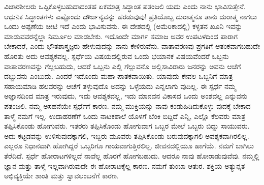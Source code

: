 ವಿಚಾರಶೀಲರು ಒಪ್ಪಿಕೊಳ್ಳಬಹುದಾದಂತಹ ಏಕಮಾತ್ರ ಸಿದ್ಧಾಂತ ಪತಂಜಲಿ ಯದು ಎಂದು ನಾನು ಭಾವಿಸುತ್ತೇನೆ. ಆಧುನಿಕ ಸಿದ್ಧಾಂತಗಳು ಎಷ್ಟೊಂದು ದೌರ್ಜನ್ಯವನ್ನು ಹರಡುವುವು! ಪ್ರತಿಯೊಬ್ಬ ದುರಾತ್ಮನೂ ತಾನು ದುರಾತ್ಮ ನಾಗಲು ಒಂದು ಅಪ್ಪಣೆಯ ಚೀಟಿ ಇದೆ ಎಂದು ಭಾವಿಸುವನು. ಈ ದೇಶದಲ್ಲಿ (ಅಮೆರಿಕಾದಲ್ಲಿ) ಕಳ್ಳತನ ಖೂನಿ ಇವನ್ನು ಮಾಡುವವರನ್ನೆಲ್ಲಾ ನಿರ್ಮೂಲ ಮಾಡಬೇಕು. ಇದೊಂದೇ ಮಾರ್ಗ ಸಮಾಜ ಅವರ ಉಪಟಳದಿಂದ ಪಾರಾಗ ಬೇಕಾದರೆ, ಎಂದು ಭೌತಶಾಸ್ತ್ರಜ್ಞರು ಹೇಳುವುದನ್ನು ನಾನು ಕೇಳಿರುವೆನು. ವಾತಾವರಣವು ಪ್ರಗತಿಗೆ ಆತಂಕವಾಗಬಹುದೇ ಹೊರತು ಅದು ಆವಶ್ಯಕವಲ್ಲ. ಸ್ಪರ್ಧೆಯ ವಿಷಯದಲ್ಲಿರುವ ಒಂದು ಭಯಾನಕ ವಿಷಯವೆಂದರೆ ಒಬ್ಬನು ವಾತಾವರಣವನ್ನು ಗೆಲ್ಲಬಹುದು, ಆದರೆ ಒಬ್ಬನು ಎಲ್ಲಿ ಗೆಲ್ಲುವನೊ ಅಲ್ಲಿಸಾವಿರಾರು ಜನರನ್ನು ಅವನು ಆಚೆಗೆ ದಬ್ಬುವನು ಎಂಬುದು. ಎಂದರೆ ಇದೊಂದು ಮಹಾ ಪಾತಕವಾಯಿತು. ಯಾವುದು ಕೇವಲ ಒಬ್ಬನಿಗೆ ಮಾತ್ರ ಸಹಾಯಮಾಡಿ ಹಲವರನ್ನು ಆಚೆಗೆ ತಳ್ಳುವುದೊ ಅದನ್ನು ಒಳ್ಳೆಯದು ಎನ್ನಲಾಗು ವುದಿಲ್ಲ. ಈ ಸ್ಪರ್ಧೆ ನಮ್ಮ ಅಜ್ಞಾನದಿಂದ ಮಾತ್ರ ಇರುವುದು, ಇದು ಆವಶ್ಯಕವಲ್ಲ, ಇದು ಮಾನವನ ವಿಕಾಸದ ಒಂದು ಅಂಶವಲ್ಲ ಎನ್ನುವನು ಪತಂಜಲಿ. ನಮ್ಮ ಅಸಹನೆಯೇ ಸ್ಪರ್ಧೆಗೆ ಕಾರಣ. ನಮ್ಮ ಮುಕ್ತಿಯನ್ನು ನಾವು ಕಂಡುಹಿಡಿದುಕೊಳ್ಳು ವುದಕ್ಕೆ ಬೇಕಾದ ತಾಳ್ಮೆ ನಮಗೆ ಇಲ್ಲ. ಉದಾಹರಣೆಗೆ ಒಂದು ನಾಟಕಶಾಲೆ ಯೊಳಗೆ ಬೆಂಕಿ ಬಿದ್ದಿದೆ ಎನ್ನಿ, ಎಲ್ಲೊ ಕೆಲವರು ಮಾತ್ರ ತಪ್ಪಿಸಿಕೊಂಡು ಹೋಗುವರು. ಇತರರು ತಪ್ಪಿಸಿಕೊಂಡು ಹೋಗುವಾಗ ಒಬ್ಬರ ಮೇಲೆ ಒಬ್ಬರು ಬಿದ್ದು ಸಾಯುವರು. ಅದು ಕಟ್ಟಡವನ್ನು ಉಳಿಸುವುದಕ್ಕಾಗಲಿ, ಇಬ್ಬರು ಮೂವರು ತಪ್ಪಿಸಿಕೊಂಡು ಬರುವುದಕ್ಕಾಗಲಿ ಅವಶ್ಯಕವಾಗಿರಲಿಲ್ಲ. ಎಲ್ಲರೂ ನಿಧಾನವಾಗಿ ಹೋಗಿದ್ದರೆ ಒಬ್ಬರಿಗೂ ಗಾಯವಾಗುತ್ತಿರಲಿಲ್ಲ. ಜೀವನದಲ್ಲಿಯೂ ಹಾಗೆಯೆ. ನಮಗೆ ಬಾಗಿಲು ತೆರೆದಿದೆ. ಸ್ಪರ್ಧೆ ಹೋರಾಟಗಳಿಲ್ಲದೆ ನಾವೆಲ್ಲ ಹೊರಗೆ ಹೋಗಬಹುದು. ಆದರೂ ನಾವು ಹೋರಾಡುವುವೆವು. ನಮ್ಮಲ್ಲಿ ಜ್ಞಾನ ಮತ್ತು ತಾಳ್ಮೆ ಇಲ್ಲವಾಗಿರುವುದೇ ಈ ಹೋರಾಟಕ್ಕೆಲ್ಲ ಕಾರಣ. ನಮಗೆ ತುಂಬಾ ಆತುರ. ಶಕ್ತಿಯ ಅತ್ಯುನ್ನತ ಅಭಿವ್ಯಕ್ತಿಯೇ ಶಾಂತಿ ಮತ್ತು ಸ್ವಾವಲಂಬನೆಗೆ ಕಾರಣ.

